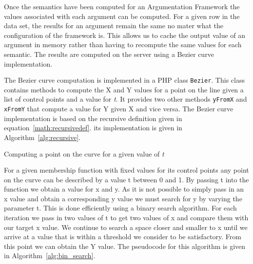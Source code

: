 Once the semantics have been computed for an Argumentation Framework the values associated with each argument can be computed. For a given row in the data set, the results for an argument remain the same no mater what the configuration of the framework is. This allows us to cache the output value of an argument in memory rather than having to recompute the same values for each semantic. The results are computed on the server using a Bezier curve implementation. 

The Bezier curve computation is implemented in a PHP class \lstinline{Bezier}. This class contains methods to compute the X and Y values for a point on the line given a list of control points and a value for \textit{t}. It provides two other methods \lstinline{yFromX} and \lstinline{xFromY} that compute a value for Y given X and vice versa. The Bezier curve implementation is based on the recursive definition given in equation~\ref{math:recursivedef}. its implementation is given in Algorithm~\ref{alg:recursive}.

\begin{algorithm}[H]
\label{alg:recursive}
\SetAlgoLined
{}
\caption{Computing a point on the curve for a given value of \textit{t}}
\end{algorithm}

For a given membership function with fixed values for its control points any point on the curve can be described by a value t between 0 and 1. By passing t into the function we obtain a value for x and y. As it is not possible to simply pass in an x value and obtain a corresponding y value we must search for y by varying the parameter t. This is done efficiently using a binary search algorithm. For each iteration we pass in two values of t to get two values of x and compare them with our target x value. We continue to search a space closer and smaller to x until we arrive at a value that is within a threshold we consider to be satisfactory. From this point we can obtain the Y value. The pseudocode for this algorithm is given in Algorithm~\ref{alg:bin_search}.

